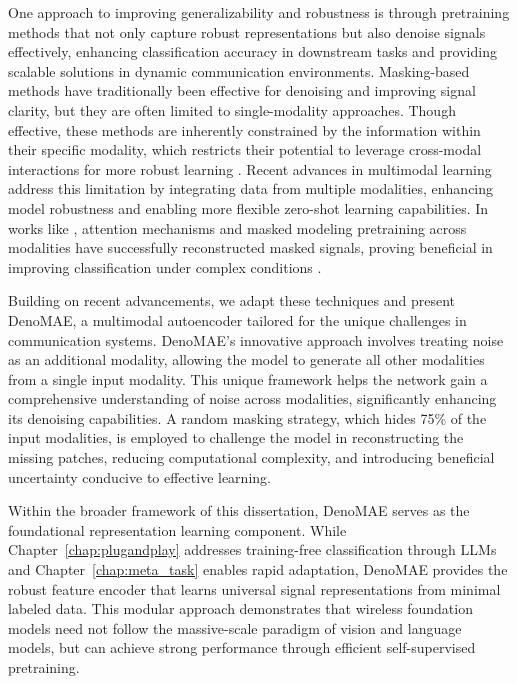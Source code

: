One approach to improving generalizability and robustness is through pretraining methods that not only capture robust representations but also denoise signals effectively, enhancing classification accuracy in downstream tasks and providing scalable solutions in dynamic communication environments. Masking-based methods have traditionally been effective for denoising and improving signal clarity, but they are often limited to single-modality approaches. Though effective, these methods are inherently constrained by the information within their specific modality, which restricts their potential to leverage cross-modal interactions for more robust learning \cite{shi2023gaf, huang2022deep}. Recent advances in multimodal learning address this limitation by integrating data from multiple modalities, enhancing model robustness and enabling more flexible zero-shot learning capabilities. In works like \cite{bachmann2022multimae, bachmann20244m}, attention mechanisms and masked modeling pretraining across modalities have successfully reconstructed masked signals, proving beneficial in improving classification under complex conditions \cite{cohen2023joint, leiber2022dipencoder}.


Building on recent advancements, we adapt these techniques and present DenoMAE, a multimodal autoencoder tailored for the unique challenges in communication systems. DenoMAE's innovative approach involves treating noise as an additional modality, allowing the model to generate all other modalities from a single input modality. This unique framework helps the network gain a comprehensive understanding of noise across modalities, significantly enhancing its denoising capabilities. A random masking strategy, which hides 75\% of the input modalities, is employed to challenge the model in reconstructing the missing patches, reducing computational complexity, and introducing beneficial uncertainty conducive to effective learning.


Within the broader framework of this dissertation, DenoMAE serves as the foundational representation learning component. While Chapter~\ref{chap:plugandplay} addresses training-free classification through LLMs and Chapter~\ref{chap:meta_task} enables rapid adaptation, DenoMAE provides the robust feature encoder that learns universal signal representations from minimal labeled data. This modular approach demonstrates that wireless foundation models need not follow the massive-scale paradigm of vision and language models, but can achieve strong performance through efficient self-supervised pretraining.

